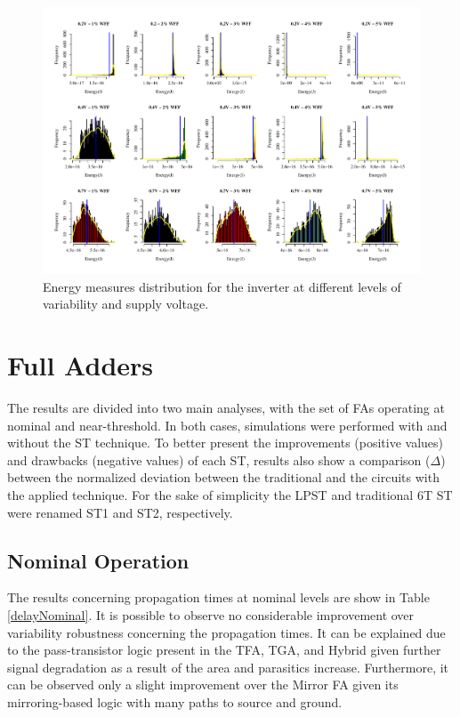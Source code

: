 \documentclass[pgmicro,diss,english]{iiufrgs}
\begin{document}
     \begin{figure}[]
        \centering
            \includegraphics[width=1.5\textwidth, trim={0cm 0cm 0cm 0cm}, clip, angle=90]{dist_energy_0_2.pdf}
            \caption{Energy measures distribution for the inverter at different levels of variability and supply voltage.}
        \label{fig:energyDist0_2}
    \end{figure}

\chapter{Full Adders}

The results are divided into two main analyses, with the set of FAs operating at nominal and near-threshold. In both cases, simulations were performed with and without the ST technique. To better present the improvements (positive values) and drawbacks (negative values) of each ST, results also show a comparison ($\Delta$) between the normalized deviation between the traditional and the circuits with the applied technique. For the sake of simplicity the LPST and traditional 6T ST were renamed ST1 and ST2, respectively.

\section{Nominal Operation}

The results concerning propagation times at nominal levels are show in Table \ref{delayNominal}. It is possible to observe no considerable improvement over variability robustness concerning the propagation times. It can be explained due to the pass-transistor logic present in the TFA, TGA, and Hybrid given further signal degradation as a result of the area and parasitics increase. Furthermore, it can be observed only a slight improvement over the Mirror FA given its mirroring-based logic with many paths to source and ground.
\end{document}
